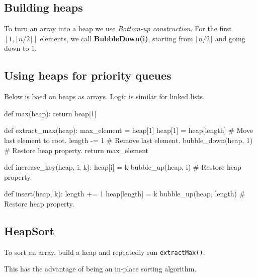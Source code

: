 \subsection{Building heaps}
To turn an array into a heap we use \emph{Bottom-up construction}.
For the first $[1, \lfloor n / 2 \rfloor]$ elements, we call \textbf{BubbleDown(i)}, starting from $\lfloor n / 2 \rfloor$ and going down to 1.


\subsection{Using heaps for priority queues}
Below is baed on heaps as arrays. Logic is similar for linked lists.
\begin{python}
def max(heap):
    return heap[1]

def extract_max(heap):
    max_element = heap[1]
    heap[1] = heap[length] # Move last element to root.
    length -= 1 # Remove last element.
    bubble_down(heap, 1) # Restore heap property.
    return max_element

def increase_key(heap, i, k):
    heap[i] = k
    bubble_up(heap, i) # Restore heap property.

def insert(heap, k):
    length += 1
    heap[length] = k
    bubble_up(heap, length) # Restore heap property.
\end{python}

\subsection{HeapSort}
To sort an array, build a heap and repeatedly run \verb|extractMax()|.

This has the advantage of being an in-place sorting algorithm.

